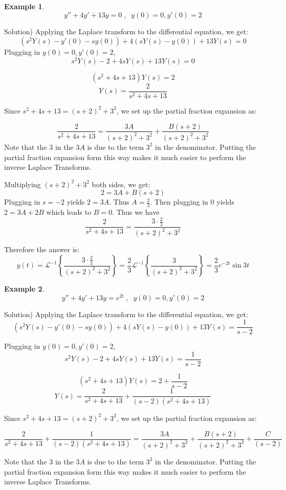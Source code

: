 \documentclass[12pt]{report}
\newtheorem{ex}{Example}[section]
\begin{document}
\begin{ex}
$$y''+4y'+13y =0  \; , \; \; y(0)=0, y'(0)=2 $$
\end{ex}
Solution)
Applying the Laplace transform to the differential equation, we get:
$$ \left( s^2 Y(s) - y'(0) - s y(0) \right) +4 \left( s Y(s) - y(0) \right) + 13 Y(s) =0 $$
Plugging in $y(0)=0, y'(0)=2 $,
$$ s^2 Y(s) -2 +4s Y(s) + 13 Y(s) = 0 $$

$$ (s^2+4s+13) Y(s) = 2 $$
$$ Y(s) = \frac{2}{s^2+4s+13} $$

Since $s^2+4s+13 = (s+2)^2 + 3^2 $, we set up the partial fraction expansion as:

$$ \frac{2}{s^2+4s+13}= \frac{3A}{(s+2)^2 + 3^2} + \frac{B(s+2)}{(s+2)^2 + 3^2} $$
Note that the $3$ in the $3A$ is due to the term $3^2$ in the denominator. Putting the partial fraction expansion form this way makes it much easier to perform the inverse Laplace Transforms. 

Multiplying $(s+2)^2 + 3^2$ both sides, we get:
$$2 = 3A+ B(s+2) $$
Plugging in $s=-2$ yields $2=3A$. Thus $A=\frac{2}{3}$. Then plugging in $0$ yields $2=3A+2B$ which leads to $B=0$. Thus we have
$$ \frac{2}{s^2+4s+13}=\frac{3 \cdot \tfrac{2}{3}}{(s+2)^2 + 3^2}$$

Therefore the answer is:
$$y(t) = \mathcal{L}^{-1} \left\{\frac{3 \cdot  \tfrac{2}{3}}{(s+2)^2 + 3^2}\right\} = \frac{2}{3} \mathcal{L}^{-1} \left\{\frac{3}{(s+2)^2 + 3^2}\right\} =  \frac{2}{3} e^{-2t} \sin{3t}$$

\begin{ex}
$$y''+4y'+13y = e^{2t}  \; , \; \; y(0)=0, y'(0)=2 $$
\end{ex}
Solution)
Applying the Laplace transform to the differential equation, we get:
$$ \left( s^2 Y(s) - y'(0) - s y(0) \right) +4 \left( s Y(s) - y(0) \right) + 13 Y(s) =\frac{1}{s-2} $$

Plugging in $y(0)=0, y'(0)=2 $,
$$ s^2 Y(s) -2 +4s Y(s) + 13 Y(s) = \frac{1}{s-2} $$

$$ (s^2+4s+13) Y(s) = 2 + \frac{1}{s-2} $$
$$ Y(s) = \frac{2}{s^2+4s+13} +\frac{1}{(s-2)(s^2+4s+13)} $$

Since $s^2+4s+13 = (s+2)^2 + 3^2 $, we set up the partial fraction expansion as:

$$ \frac{2}{s^2+4s+13} +\frac{1}{(s-2)(s^2+4s+13)}= \frac{3A}{(s+2)^2 + 3^2} + \frac{B(s+2)}{(s+2)^2 + 3^2} + \frac{C}{(s-2)} $$

Note that the $3$ in the $3A$ is due to the term $3^2$ in the denominator. Putting the partial fraction expansion form this way makes it much easier to perform the inverse Laplace Transforms. 
\end{document}
